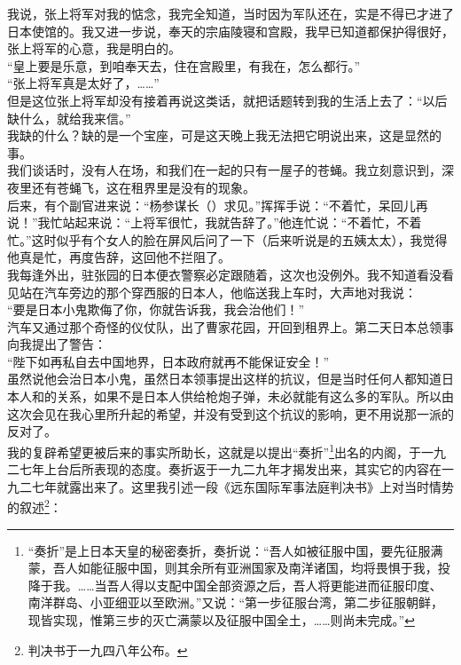 我说，张上将军对我的惦念，我完全知道，当时因为军队还在，实是不得已才进了日本使馆的。我又进一步说，奉天的宗庙陵寝和宫殿，我早已知道都保护得很好，张上将军的心意，我是明白的。\\

“皇上要是乐意，到咱奉天去，住在宫殿里，有我在，怎么都行。”\\

“张上将军真是太好了，……”\\

但是这位张上将军却没有接着再说这类话，就把话题转到我的生活上去了：“以后缺什么，就给我来信。”\\

我缺的什么？缺的是一个宝座，可是这天晚上我无法把它明说出来，这是显然的事。\\

我们谈话时，没有人在场，和我们在一起的只有一屋子的苍蝇。我立刻意识到，深夜里还有苍蝇飞，这在租界里是没有的现象。\\

后来，有个副官进来说：“杨参谋长（）求见。”挥挥手说：“不着忙，呆回儿再说！”我忙站起来说：“上将军很忙，我就告辞了。”他连忙说：“不着忙，不着忙。”这时似乎有个女人的脸在屏风后问了一下（后来听说是的五姨太太），我觉得他真是忙，再度告辞，这回他不拦阻了。\\

我每逢外出，驻张园的日本便衣警察必定跟随着，这次也没例外。我不知道看没看见站在汽车旁边的那个穿西服的日本人，他临送我上车时，大声地对我说：\\

“要是日本小鬼欺侮了你，你就告诉我，我会治他们！”\\

汽车又通过那个奇怪的仪仗队，出了曹家花园，开回到租界上。第二天日本总领事向我提出了警告：\\

“陛下如再私自去中国地界，日本政府就再不能保证安全！”\\

虽然说他会治日本小鬼，虽然日本领事提出这样的抗议，但是当时任何人都知道日本人和的关系，如果不是日本人供给枪炮子弹，未必就能有这么多的军队。所以由这次会见在我心里所升起的希望，并没有受到这个抗议的影响，更不用说那一派的反对了。\\

我的复辟希望更被后来的事实所助长，这就是以提出“奏折”\footnote{“奏折”是上日本天皇的秘密奏折，奏折说：“吾人如被征服中国，要先征服满蒙，吾人如能征服中国，则其余所有亚洲国家及南洋诸国，均将畏惧于我，投降于我。……当吾人得以支配中国全部资源之后，吾人将更能进而征服印度、南洋群岛、小亚细亚以至欧洲。”又说：“第一步征服台湾，第二步征服朝鲜，现皆实现，惟第三步的灭亡满蒙以及征服中国全土，……则尚未完成。”}出名的内阁，于一九二七年上台后所表现的态度。奏折返于一九二九年才揭发出来，其实它的内容在一九二七年就露出来了。这里我引述一段《远东国际军事法庭判决书》上对当时情势的叙述\footnote{判决书于一九四八年公布。}：\\

